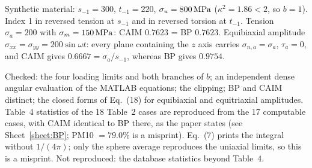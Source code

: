  Synthetic material: $s_{-1}=300$, $t_{-1}=220$, $\sigma_u=800\,\mathrm{MPa}$
($\kappa^2=1.86<2$, so $b=1$). Index 1 in reversed tension at $s_{-1}$ and in reversed torsion at
$t_{-1}$. Tension $\sigma_a=200$ with $\sigma_m=150\,\mathrm{MPa}$: CAIM $0.7623$ = BP $0.7623$. Equibiaxial
amplitude $\sigma_{xx}=\sigma_{yy}=200\sin\omega t$: every plane containing the $z$ axis carries
$\sigma_{n,a}=\sigma_a$, $\tau_a=0$, and CAIM gives $0.6667=\sigma_a/s_{-1}$, whereas BP gives
$0.9754$.

 Checked: the four loading limits and both branches of $b$; an independent dense
angular evaluation of the MATLAB equations; the clipping; BP and CAIM distinct; the closed forms of
Eq.~(18) for equibiaxial and equitriaxial amplitudes. Table~4 statistics of the 18 Table~2 cases are
reproduced from the 17 computable cases, with CAIM identical to BP there, as the paper states (see
Sheet~\ref{sheet:BP}; PM10 $=79.0\%$ is a misprint). Eq.~(7) prints the integral without
$1/(4\pi)$; only the sphere average reproduces the uniaxial limits, so this is a misprint. Not
reproduced: the database statistics beyond Table~4.
